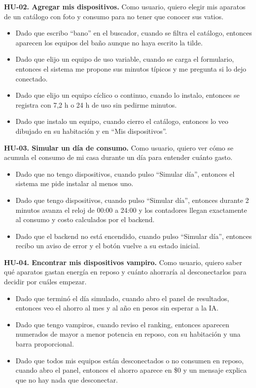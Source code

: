 \documentclass[10pt,journal,compsoc]{IEEEtran}
\begin{document}
\textbf{HU-02. Agregar mis dispositivos.} Como usuario, quiero elegir mis aparatos de un catálogo con foto y consumo para no tener que conocer sus vatios.
\begin{itemize}
\item Dado que escribo ``bano'' en el buscador, cuando se filtra el catálogo, entonces aparecen los equipos del baño aunque no haya escrito la tilde.
\item Dado que elijo un equipo de uso variable, cuando se carga el formulario, entonces el sistema me propone sus minutos típicos y me pregunta si lo dejo conectado.
\item Dado que elijo un equipo cíclico o continuo, cuando lo instalo, entonces se registra con 7,2 h o 24 h de uso sin pedirme minutos.
\item Dado que instalo un equipo, cuando cierro el catálogo, entonces lo veo dibujado en su habitación y en ``Mis dispositivos''.
\end{itemize}

\textbf{HU-03. Simular un día de consumo.} Como usuario, quiero ver cómo se acumula el consumo de mi casa durante un día para entender cuánto gasto.
\begin{itemize}
\item Dado que no tengo dispositivos, cuando pulso ``Simular día'', entonces el sistema me pide instalar al menos uno.
\item Dado que tengo dispositivos, cuando pulso ``Simular día'', entonces durante 2 minutos avanza el reloj de 00:00 a 24:00 y los contadores llegan exactamente al consumo y costo calculados por el backend.
\item Dado que el backend no está encendido, cuando pulso ``Simular día'', entonces recibo un aviso de error y el botón vuelve a su estado inicial.
\end{itemize}

\textbf{HU-04. Encontrar mis dispositivos vampiro.} Como usuario, quiero saber qué aparatos gastan energía en reposo y cuánto ahorraría al desconectarlos para decidir por cuáles empezar.
\begin{itemize}
\item Dado que terminó el día simulado, cuando abro el panel de resultados, entonces veo el ahorro al mes y al año en pesos sin esperar a la IA.
\item Dado que tengo vampiros, cuando reviso el ranking, entonces aparecen numerados de mayor a menor potencia en reposo, con su habitación y una barra proporcional.
\item Dado que todos mis equipos están desconectados o no consumen en reposo, cuando abro el panel, entonces el ahorro aparece en \$0 y un mensaje explica que no hay nada que desconectar.
\end{itemize}
\end{document}
